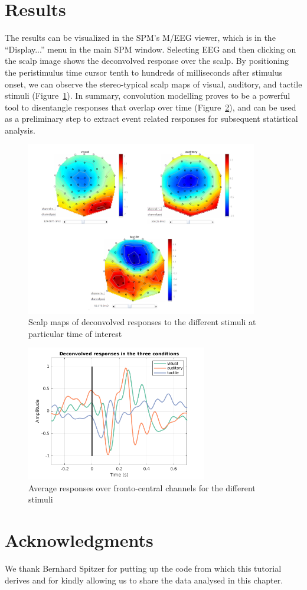 	\section{Results}
		The results can be visualized in the SPM's M/EEG viewer, which is in the ``Display...'' menu in the main SPM window. Selecting EEG and then clicking on the scalp image shows the deconvolved response over the scalp. By positioning the peristimulus time cursor tenth to hundreds of milliseconds after stimulus onset, we can observe the stereo-typical scalp maps of visual, auditory, and tactile stimuli (Figure~\ref{fig:meeg-firstlevel:scalp}). In summary, convolution modelling proves to be a powerful tool to disentangle responses that overlap over time (Figure~\ref{fig:meeg-firstlevel:responses}), and can be used as a preliminary step to extract event related responses for subsequent statistical analysis. 
		\begin{figure}[htb]
			\centering
			\includegraphics[width=0.9\textwidth]{meeg_firstlevel/figures/scalp.png}
			\caption{Scalp maps of deconvolved responses to the different stimuli at particular time of interest}
			\label{fig:meeg-firstlevel:scalp}
		\end{figure}
		\begin{figure}[htb]
			\centering
			\includegraphics[width=0.7\textwidth]{meeg_firstlevel/figures/result-response.png}
			\caption{Average responses over fronto-central channels for the different stimuli}
			\label{fig:meeg-firstlevel:responses}
		\end{figure}

	\section{Acknowledgments}
		We thank Bernhard Spitzer for putting up the code from which this tutorial derives and for kindly allowing us to share the data analysed in this chapter.  